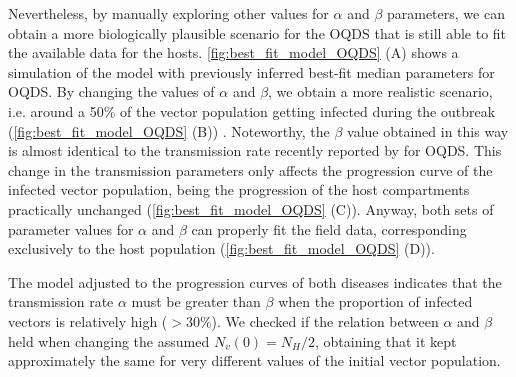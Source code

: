 Nevertheless, by manually exploring other values for $\alpha$ and $\beta$
parameters, we can obtain a more biologically plausible scenario for the OQDS
that is still able to fit the available data for the hosts.
\cref{fig:best_fit_model_OQDS} (A) shows a simulation of the model with
previously inferred best-fit median parameters for OQDS. By changing the values
of $\alpha$ and $\beta$, we obtain a more realistic scenario, i.e. around a
50\% of the vector population getting infected during the outbreak
(\cref{fig:best_fit_model_OQDS} (B)) \cite{Cavalieri2019,
    cornara2017transmission}. Noteworthy, the $\beta$ value obtained in this
way
is almost identical to the transmission rate recently reported by
\cite{Bodino2021} for OQDS. This change in the transmission parameters only
affects the progression curve of the infected vector population, being the
progression of the host compartments practically unchanged
(\cref{fig:best_fit_model_OQDS} (C)). Anyway, both sets of parameter values for
$\alpha$ and $\beta$ can properly fit the field data, corresponding exclusively
to the	host population (\cref{fig:best_fit_model_OQDS} (D)).

The model adjusted to the progression curves of both diseases indicates
that the transmission rate $\alpha$ must be greater than $\beta$ when the
proportion of infected vectors is relatively high ($>30\%$). We checked if the
relation between $\alpha$ and $\beta$ held when changing the assumed
$N_v(0)=N_H/2$, obtaining that it kept approximately the same for very
different values of the initial vector population.

